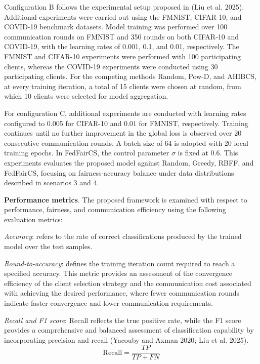 \documentclass[pdflatex,sn-mathphys-num,oneside]{sn-jnl}%
\theoremstyle{thmstyleone}%
\theoremstyle{thmstyletwo}%
\theoremstyle{thmstylethree}%
\begin{document}
Configuration B follows the experimental setup proposed in (Liu et al. 2025). Additional experiments were carried out using the FMNIST, CIFAR-10, and COVID-19 benchmark datasets. Model training was performed over 100 communication rounds on FMNIST and 350 rounds on both CIFAR-10 and COVID-19, with the learning rates of 0.001, 0.1, and 0.01, respectively. The FMNIST and CIFAR-10 experiments were performed with 100 participating clients, whereas the COVID-19 experiments were conducted using 30 participating clients. For the competing methods Random, Pow-D, and AHIBCS, at every training iteration, a total of 15 clients were chosen at random, from which 10 clients were selected for model aggregation.

For configuration C, additional experiments are conducted with learning rates configured to 0.005 for CIFAR-10 and 0.01 for FMNIST, respectively. Training continues until no further improvement in the global loss is observed over 20 consecutive communication rounds. A batch size of 64 is adopted with 20 local training epochs. In FedFairCS, the control parameter $\sigma$ is fixed at 0.6. This experiments evaluates the proposed model against Random, Greedy, RBFF, and FedFairCS, focusing on fairness-accuracy balance under data distributions described in scenarios 3 and 4.

\textbf{Performance metrics}. The proposed framework is examined with respect to performance, fairness, and communication efficiency using the following evaluation metrics:

\textit{Accuracy}: refers to the rate of correct classifications produced by the trained model over the test samples.

\textit{Round-to-accuracy}: defines the training iteration count required to reach a specified accuracy. This metric provides an assessment of the convergence efficiency of the client selection strategy and the communication cost associated with achieving the desired performance, where fewer communication rounds indicate faster convergence and lower communication requirements.

\textit{Recall and F1 score}: Recall reflects the true positive rate, while the F1 score provides a comprehensive and balanced assessment of classification capability by incorporating precision and recall (Yacouby and Axman 2020; Liu et al. 2025). 
\begin{equation}
\text{Recall} = \frac{TP}{TP + FN}
\label{eq:recall}
\end{equation}
\end{document}
